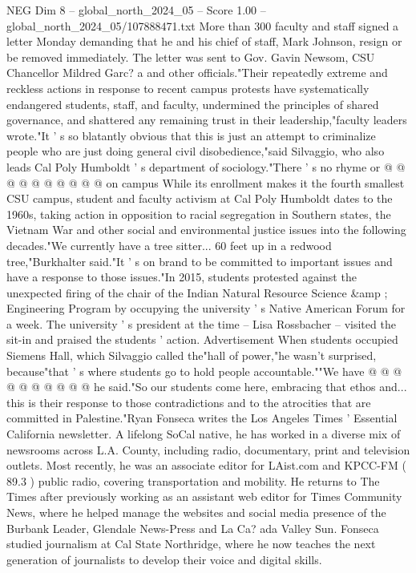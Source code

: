 \begin{textsample}{NEG Dim 8 – global\_north\_2024\_05 – Score 1.00 – global\_north\_2024\_05/107888471.txt}
More than 300 faculty and staff signed a letter Monday demanding that he and his chief of staff, Mark Johnson, resign or be removed immediately.
The letter was sent to Gov.
Gavin Newsom, CSU Chancellor Mildred Garc? a and other officials."Their repeatedly extreme and reckless actions in response to recent campus protests have systematically endangered students, staff, and faculty, undermined the principles of shared governance, and shattered any remaining trust in their leadership,"faculty leaders wrote."It ' s so blatantly obvious that this is just an attempt to criminalize people who are just doing general civil disobedience,"said Silvaggio, who also leads Cal Poly Humboldt ' s department of sociology."There ' s no rhyme or @ @ @ @ @ @ @ @ @ @ on campus While its enrollment makes it the fourth smallest CSU campus, student and faculty activism at Cal Poly Humboldt dates to the 1960s, taking action in opposition to racial segregation in Southern states, the Vietnam War and other social and environmental justice issues into the following decades."We currently have a tree sitter... 60 feet up in a redwood tree,"Burkhalter said."It ' s on brand to be committed to important issues and have a response to those issues."In 2015, students protested against the unexpected firing of the chair of the Indian Natural Resource Science \&amp ; Engineering Program by occupying the university ' s Native American Forum for a week.
The university ' s president at the time -- Lisa Rossbacher -- visited the sit-in and praised the students ' action.
Advertisement When students occupied Siemens Hall, which Silvaggio called the"hall of power,"he wasn't surprised, because"that ' s where students go to hold people accountable.""We have @ @ @ @ @ @ @ @ @ @ he said."So our students come here, embracing that ethos and... this is their response to those contradictions and to the atrocities that are committed in Palestine."Ryan Fonseca writes the Los Angeles Times ' Essential California newsletter.
A lifelong SoCal native, he has worked in a diverse mix of newsrooms across L.A.
County, including radio, documentary, print and television outlets.
Most recently, he was an associate editor for LAist.com and KPCC-FM ( 89.3 ) public radio, covering transportation and mobility.
He returns to The Times after previously working as an assistant web editor for Times Community News, where he helped manage the websites and social media presence of the Burbank Leader, Glendale News-Press and La Ca? ada Valley Sun.
Fonseca studied journalism at Cal State Northridge, where he now teaches the next generation of journalists to develop their voice and digital skills.

\end{textsample}
